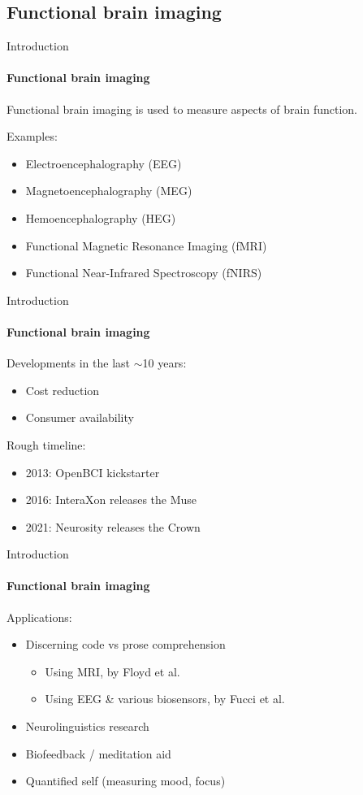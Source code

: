 \documentclass[xcolor={dvipsnames,table},12pt]{beamer}
\begin{document}
\subsection{Functional brain imaging}
\begin{frame}{Introduction}
    \framesubtitle{Functional brain imaging}

    Functional brain imaging is used to measure aspects of brain function.

    Examples:
    \begin{itemize}
        \item Electroencephalography (EEG)
        \item Magnetoencephalography (MEG)
        \item Hemoencephalography (HEG)
        \item Functional Magnetic Resonance Imaging (fMRI)
        \item Functional Near-Infrared Spectroscopy (fNIRS)
    \end{itemize}
\end{frame}

\begin{frame}{Introduction}
    \framesubtitle{Functional brain imaging}

    Developments in the last $\sim$10 years:

    \begin{itemize}
        \item Cost reduction
        \item Consumer availability
    \end{itemize}

    Rough timeline:

    \begin{itemize}
        \item 2013: OpenBCI kickstarter
        \item 2016: InteraXon releases the Muse
        \item 2021: Neurosity releases the Crown
    \end{itemize}
\end{frame}

\begin{frame}{Introduction}
    \framesubtitle{Functional brain imaging}

    Applications:

    \begin{itemize}
        \item Discerning code vs prose comprehension
            \begin{itemize}
                \item Using MRI, by Floyd et al.~\cite{floyd_decoding_2017}
                \item Using EEG \& various biosensors, by Fucci et al.~\cite{fucci_replication_2019}
            \end{itemize}
        \item Neurolinguistics research
        \item Biofeedback / meditation aid
        \item Quantified self (measuring mood, focus)
    \end{itemize}
\end{frame}
\end{document}
